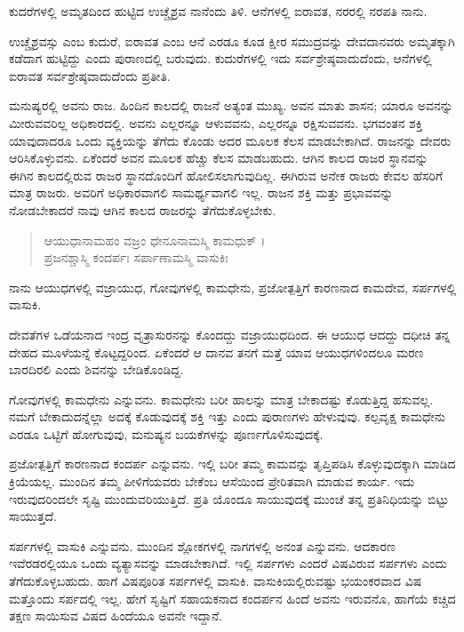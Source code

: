 {\small ಕುದರೆಗಳಲ್ಲಿ ಅಮೃತದಿಂದ ಹುಟ್ಟಿದ ಉಚ್ಚೈಶ್ರವ ನಾನೆಂದು ತಿಳಿ. ಆನೆಗಳಲ್ಲಿ ಐರಾವತ, ನರರಲ್ಲಿ ನರಪತಿ ನಾನು.}

ಉಚ್ಚೈಶ್ರವಸ್ಸು ಎಂಬ ಕುದುರೆ, ಐರಾವತ ಎಂಬ ಆನೆ ಎರಡೂ ಕೂಡ ಕ್ಷೀರ ಸಮುದ್ರವನ್ನು ದೇವದಾನವರು ಅಮೃತಕ್ಕಾಗಿ ಕಡೆದಾಗ ಹುಟ್ಟಿದ್ದು ಎಂದು ಪುರಾಣದಲ್ಲಿ ಬರುವುದು. ಕುದುರೆಗಳಲ್ಲಿ ಇದು ಸರ್ವಶ್ರೇಷ್ಠವಾದುದೆಂದು, ಆನೆಗಳಲ್ಲಿ ಐರಾವತ ಸರ್ವಶ್ರೇಷ್ಠವಾದುದೆಂದು ಪ್ರತೀತಿ.

ಮನುಷ್ಯರಲ್ಲಿ ಅವನು ರಾಜ. ಹಿಂದಿನ ಕಾಲದಲ್ಲಿ ರಾಜನೆ ಅತ್ಯಂತ ಮುಖ್ಯ. ಅವನ ಮಾತು ಶಾಸನ; ಯಾರೂ ಅವನನ್ನು ಮೀರುವವರಿಲ್ಲ ಅಧಿಕಾರದಲ್ಲಿ. ಅವನು ಎಲ್ಲರನ್ನೂ ಆಳುವವನು, ಎಲ್ಲರನ್ನೂ ರಕ್ಷಿಸುವವನು. ಭಗವಂತನ ಶಕ್ತಿ ಯಾವುದಾದರೂ ಒಂದು ವ್ಯಕ್ತಿಯನ್ನು ತೆಗೆದು ಕೊಂಡು ಅದರ ಮೂಲಕ ಕೆಲಸ ಮಾಡಬೇಕಾಗಿದೆ. ರಾಜನನ್ನು ದೇವರು ಆರಿಸಿಕೊಳ್ಳುವನು. ಏಕೆಂದರೆ ಅವನ ಮೂಲಕ ಹೆಚ್ಚು ಕೆಲಸ ಮಾಡಬಹುದು. ಆಗಿನ ಕಾಲದ ರಾಜರ ಸ್ಥಾನವನ್ನು ಈಗಿನ ಕಾಲದಲ್ಲಿರುವ ರಾಜರ ಸ್ಥಾನದೊಂದಿಗೆ ಹೋಲಿಸಲಾಗುವುದಿಲ್ಲ. ಈಗಿರುವ ಅನೇಕ ರಾಜರು ಕೇವಲ ಹೆಸರಿಗೆ ಮಾತ್ರ ರಾಜರು. ಅವರಿಗೆ ಅಧಿಕಾರವಾಗಲಿ ಸಾಮರ್ಥ್ಯವಾಗಲಿ ಇಲ್ಲ. ರಾಜನ ಶಕ್ತಿ ಮತ್ತು ಪ್ರಭಾವವನ್ನು ನೋಡಬೇಕಾದರೆ ನಾವು ಆಗಿನ ಕಾಲದ ರಾಜರನ್ನು ತೆಗೆದುಕೊಳ್ಳಬೇಕು.

\begin{verse}
ಆಯುಧಾನಾಮಹಂ ವಜ್ರಂ ಧೇನೂನಾಮಸ್ಮಿ ಕಾಮಧುಕ್ ।\\ಪ್ರಜನಶ್ಚಾಸ್ಮಿ ಕಂದರ್ಪಃ ಸರ್ಪಾಣಾಮಸ್ಮಿ ವಾಸುಕಿಃ 
\end{verse}

{\small ನಾನು ಆಯುಧಗಳಲ್ಲಿ ವಜ್ರಾಯುಧ, ಗೋವುಗಳಲ್ಲಿ ಕಾಮಧೇನು, ಪ್ರಜೋತ್ಪತ್ತಿಗೆ ಕಾರಣನಾದ ಕಾಮದೇವ, ಸರ್ಪಗಳಲ್ಲಿ ವಾಸುಕಿ.}

ದೇವತೆಗಳ ಒಡೆಯನಾದ ಇಂದ್ರ ವೃತ್ರಾಸುರನನ್ನು ಕೊಂದದ್ದು ವಜ್ರಾಯುಧದಿಂದ. ಈ ಆಯುಧ ಆದದ್ದು ದಧೀಚಿ ತನ್ನ ದೇಹದ ಮೂಳೆಯನ್ನೆ ಕೊಟ್ಟದ್ದರಿಂದ. ಏಕೆಂದರೆ ಆ ದಾನವ ತನಗೆ ಮತ್ತೆ ಯಾವ ಆಯುಧಗಳಿಂದಲೂ ಮರಣ ಬಾರದಿರಲಿ ಎಂದು ಶಿವನನ್ನು ಬೇಡಿಕೊಂಡಿದ್ದ.

ಗೋವುಗಳಲ್ಲಿ ಕಾಮಧೇನು ಎನ್ನುವನು. ಕಾಮಧೇನು ಬರೀ ಹಾಲನ್ನು ಮಾತ್ರ ಬೇಕಾದಷ್ಟು ಕೊಡುತ್ತಿದ್ದ ಹಸುವಲ್ಲ. ನಮಗೆ ಬೇಕಾದುದನ್ನೆಲ್ಲಾ ಅದಕ್ಕೆ ಕೊಡುವುದಕ್ಕೆ ಶಕ್ತಿ ಇತ್ತು ಎಂದು ಪುರಾಣಗಳು ಹೇಳುವುವು. ಕಲ್ಪವೃಕ್ಷ ಕಾಮಧೇನು ಎರಡೂ ಒಟ್ಟಿಗೆ ಹೋಗುವುವು, ಮನುಷ್ಯನ ಬಯಕೆಗಳನ್ನು ಪೂರ್ಣಗೊಳಿಸುವುದಕ್ಕೆ.

ಪ್ರಜೋತ್ಪತ್ತಿಗೆ ಕಾರಣನಾದ ಕಂದರ್ಪ ಎನ್ನುವನು. ಇಲ್ಲಿ ಬರೀ ತಮ್ಮ ಕಾಮವನ್ನು ತೃಪ್ತಿಪಡಿಸಿ ಕೊಳ್ಳುವುದಕ್ಕಾಗಿ ಮಾಡಿದ ಕ್ರಿಯೆಯಲ್ಲ. ಮುಂದಿನ ತಮ್ಮ ಪೀಳಿಗೆಯವರು ಬೇಕೆಂಬ ಆಸೆಯಿಂದ ಪ್ರೇರಿತವಾಗಿ ಮಾಡುವ ಕಾರ್ಯ. ಇದು ಇರುವುದರಿಂದಲೇ ಸೃಷ್ಟಿ ಮುಂದುವರಿಯುತ್ತಿದೆ. ಪ್ರತಿ ಯೊಂದೂ ಸಾಯುವುದಕ್ಕೆ ಮುಂಚೆ ತನ್ನ ಪ್ರತಿನಿಧಿಯನ್ನು ಬಿಟ್ಟು ಸಾಯುತ್ತದೆ.

ಸರ್ಪಗಳಲ್ಲಿ ವಾಸುಕಿ ಎನ್ನುವನು. ಮುಂದಿನ ಶ್ಲೋಕಗಳಲ್ಲಿ ನಾಗಗಳಲ್ಲಿ ಅನಂತ ಎನ್ನುವನು. ಆದಕಾರಣ ಇವೆರಡರಲ್ಲಿಯೂ ಒಂದು ವ್ಯತ್ಯಾಸವನ್ನು ಮಾಡಬೇಕಾಗಿದೆ. ಇಲ್ಲಿ ಸರ್ಪಗಳು ಎಂದರೆ ವಿಷವಿರುವ ಸರ್ಪಗಳು ಎಂದು ತೆಗೆದುಕೊಳ್ಳಬಹುದು. ಹಾಗೆ ವಿಷಪೂರಿತ ಸರ್ಪಗಳಲ್ಲಿ ವಾಸುಕಿ. ವಾಸುಕಿಯಲ್ಲಿರುವಷ್ಟು ಭಯಂಕರವಾದ ವಿಷ ಮತ್ತೊಂದು ಸರ್ಪದಲ್ಲಿ ಇಲ್ಲ. ಹೇಗೆ ಸೃಷ್ಟಿಗೆ ಸಹಾಯಕನಾದ ಕಂದರ್ಪನ ಹಿಂದೆ ಅವನು ಇರುವನೊ, ಹಾಗೆಯೆ ಕಚ್ಚಿದ ತಕ್ಷಣ ಸಾಯಿಸುವ ವಿಷದ ಹಿಂದೆಯೂ ಅವನೇ ಇದ್ದಾನೆ.


